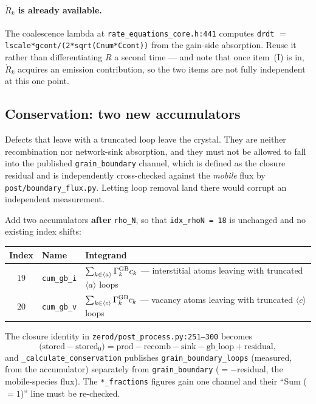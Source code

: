 \documentclass[11pt]{article}
\newcommand{\aloop}{\ensuremath{\langle a\rangle}}
\newcommand{\cloop}{\ensuremath{\langle c\rangle}}
\newcommand{\fbk}{\discretionary{}{}{}}   %
\newcommand{\file}[1]{\texttt{\small #1}}
\begin{document}
\paragraph{$\dot R_k$ is already available.}  The coalescence lambda at
\file{rate\_\fbk equations\_\fbk core.\fbk h:441} computes \verb|drdt| $=$
\verb|lscale*gcont/(2*sqrt(Cnum*Ccont))| from the gain-side absorption.
Reuse it rather than differentiating $R$ a second time --- and note that once
item~(I) is in, $\dot R_k$ acquires an emission contribution, so the two items
are not fully independent at this one point.

\subsection{Conservation: two new accumulators}

Defects that leave with a truncated loop leave the crystal.  They are neither
recombination nor network-sink absorption, and they must not be allowed to
fall into the published \verb|grain_boundary| channel, which is defined as the
closure residual and is independently cross-checked against the \emph{mobile}
flux by \file{post/\fbk boundary\_\fbk flux.\fbk py}.  Letting loop removal
land there would corrupt an independent measurement.

Add two accumulators \textbf{after} \verb|rho_N|, so that
\verb|idx_rhoN = 18| is unchanged and no existing index shifts:

\begin{center}\small
\begin{tabular}{@{}clp{}@{}}
\toprule
\textbf{Index} & \textbf{Name} & \textbf{Integrand}\\
\midrule
$19$ & \verb|cum_gb_i| & $\sum_{k\in\aloop}\Gamma_k^{\rm GB}c_k$ ---
  interstitial atoms leaving with truncated \aloop{} loops\\
$20$ & \verb|cum_gb_v| & $\sum_{k\in\cloop}\Gamma_k^{\rm GB}c_k$ ---
  vacancy atoms leaving with truncated \cloop{} loops\\
\bottomrule
\end{tabular}
\end{center}

The closure identity in \file{zerod/\fbk post\_\fbk process.\fbk py:251--300}
becomes
\begin{equation*}
\big(\text{stored}-\text{stored}_0\big)
 = \text{prod} - \text{recomb} - \text{sink} - \text{gb\_loop}
   + \text{residual},
\end{equation*}
and \verb|_calculate_conservation| publishes \verb|grain_boundary_loops|
(measured, from the accumulator) separately from \verb|grain_boundary|
($=-$residual, the mobile-species flux).  The \verb|*_fractions| figures gain
one channel and their ``Sum ($=1$)'' line must be re-checked.
\end{document}
